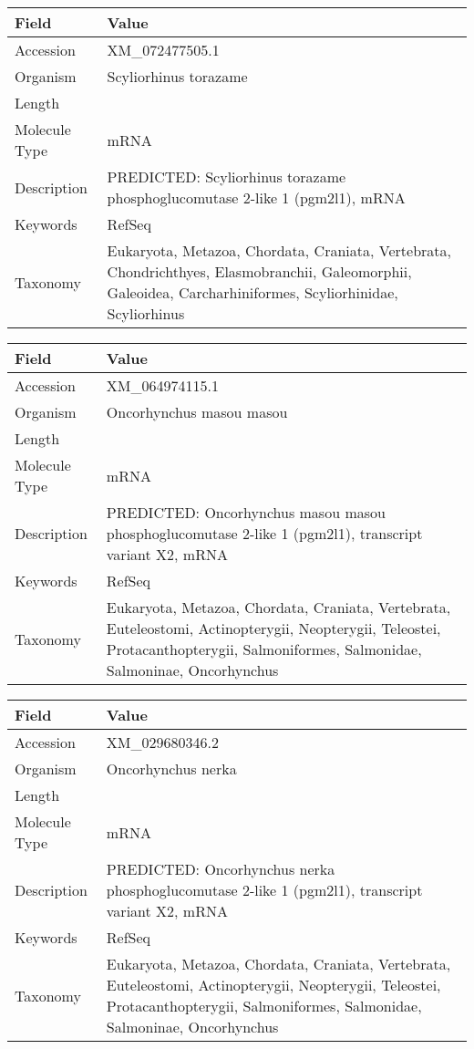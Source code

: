 \documentclass[10pt]{article}
\begin{document}
\vspace{1em}
{\footnotesize
\begin{longtable}{>{\raggedright\arraybackslash}p{4.5cm} >{\raggedright\arraybackslash}p{11.5cm}}
\textbf{Field} & \textbf{Value} \\
\hline
Accession & XM\_072477505.1 \\
Organism & Scyliorhinus torazame \\
Length & 6750 \\
Molecule Type & mRNA \\
Description & PREDICTED: Scyliorhinus torazame phosphoglucomutase 2-like 1 (pgm2l1), mRNA \\
Keywords & RefSeq \\
Taxonomy & Eukaryota, Metazoa, Chordata, Craniata, Vertebrata, Chondrichthyes, Elasmobranchii, Galeomorphii, Galeoidea, Carcharhiniformes, Scyliorhinidae, Scyliorhinus \\
\end{longtable}
}

\vspace{1em}
{\footnotesize
\begin{longtable}{>{\raggedright\arraybackslash}p{4.5cm} >{\raggedright\arraybackslash}p{11.5cm}}
\textbf{Field} & \textbf{Value} \\
\hline
Accession & XM\_064974115.1 \\
Organism & Oncorhynchus masou masou \\
Length & 4114 \\
Molecule Type & mRNA \\
Description & PREDICTED: Oncorhynchus masou masou phosphoglucomutase 2-like 1 (pgm2l1), transcript variant X2, mRNA \\
Keywords & RefSeq \\
Taxonomy & Eukaryota, Metazoa, Chordata, Craniata, Vertebrata, Euteleostomi, Actinopterygii, Neopterygii, Teleostei, Protacanthopterygii, Salmoniformes, Salmonidae, Salmoninae, Oncorhynchus \\
\end{longtable}
}

\vspace{1em}
{\footnotesize
\begin{longtable}{>{\raggedright\arraybackslash}p{4.5cm} >{\raggedright\arraybackslash}p{11.5cm}}
\textbf{Field} & \textbf{Value} \\
\hline
Accession & XM\_029680346.2 \\
Organism & Oncorhynchus nerka \\
Length & 4132 \\
Molecule Type & mRNA \\
Description & PREDICTED: Oncorhynchus nerka phosphoglucomutase 2-like 1 (pgm2l1), transcript variant X2, mRNA \\
Keywords & RefSeq \\
Taxonomy & Eukaryota, Metazoa, Chordata, Craniata, Vertebrata, Euteleostomi, Actinopterygii, Neopterygii, Teleostei, Protacanthopterygii, Salmoniformes, Salmonidae, Salmoninae, Oncorhynchus \\
\end{longtable}
}
\end{document}
